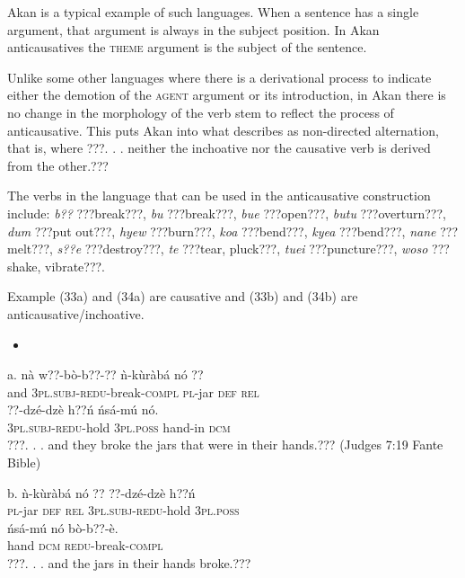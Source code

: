 \documentclass[output=paper]{langsci/langscibook}
\begin{document}
Akan is a typical example of such languages. When a sentence has a single argument, that argument is always in the subject position. In Akan anticausatives the \textsc{theme} argument is the subject of the sentence. 

Unlike some other languages where there is a derivational process to indicate either the demotion of the \textsc{agent} argument or its introduction, in Akan there is no change in the morphology of the verb stem to reflect the process of anticausative. This puts Akan into what \citet[91]{Haspelmath1993} describes as non-directed alternation, that is, where ???. . . neither the inchoative nor the causative verb is derived from the other.???

The verbs in the language that can be used in the anticausative construction include: \emph{b??} ???break???, \emph{bu} ???break???, \emph{bue} ???open???, \emph{butu} ???overturn???, \emph{dum} ???put out???, \emph{hyew} ???burn???, \emph{koa} ???bend???, \emph{kyea} ???bend???, \emph{nane} ???melt???, \emph{s??e} ???destroy???, \emph{te} ???tear, pluck???, \emph{tuei} ???puncture???, \emph{woso} ???shake, vibrate???. 

Example (33a) and (34a) are causative and (33b) and (34b) are anticausative/inchoative.

\begin{itemize}
\item \end{itemize}
\gll a.  n\`{a}  w??-b\`{o}-b??-??       \`{n}-k\`{u}r\`{a}b\'{a}   n\'{o}  ?? \\
       and  \textsc{3pl.subj}{}-\textsc{redu}{}-break\textsc{{}-compl}  \textsc{pl}{}-jar    \textsc{def}  \textsc{rel}  \\
\gll   ??{}-dz\'{e}-dz\`{e}    h??\'{n}    \'{n}s\'{a}-m\'{u}    n\'{o}.   \\
             \textsc{3pl.subj}{}-\textsc{redu}{}-hold  \textsc{3pl.poss}  hand-in  \textsc{dcm}\\
\glt ???. . .  and they broke the jars that were in their hands.??? (Judges 7:19 Fante Bible)
\z

\gll  b.  \`{n}-k\`{u}r\`{a}b\'{a}   n\'{o}  ??  ??{}-dz\'{e}-dz\`{e}    h??\'{n}  \\
       \textsc{pl}{}-jar    \textsc{def}  \textsc{rel}  \textsc{3pl.subj}{}-\textsc{redu}{}-hold  \textsc{3pl.poss}\\
\gll   \'{n}s\'{a}-m\'{u}    n\'{o}    b\`{o}-b??-\`{e}.\\
       hand    \textsc{dcm}    \textsc{redu}{}-break-\textsc{compl}\\
\glt ???. . .  and the jars in their hands broke.???
\z
\end{document}
